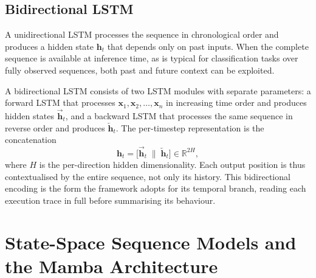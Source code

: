 \documentclass[%
    BCOR=10mm,
    DIV=13,
    toc=bibliography,
    toc=listof,
    oneside,
    12pt,
]{scrbook}
\begin{document}
\subsection{Bidirectional LSTM}
\label{subsec:bilstm}

A unidirectional LSTM processes the sequence in chronological order and
produces a hidden state $\mathbf{h}_t$ that depends only on past inputs. When
the complete sequence is available at inference time, as is typical for
classification tasks over fully observed sequences, both past and future
context can be exploited.

A bidirectional LSTM consists of two LSTM modules with separate parameters: a
forward LSTM that processes $\mathbf{x}_1, \mathbf{x}_2, \ldots, \mathbf{x}_n$
in increasing time order and produces hidden states
$\overrightarrow{\mathbf{h}}_t$, and a backward LSTM that processes the same
sequence in reverse order and produces $\overleftarrow{\mathbf{h}}_t$. The
per-timestep representation is the concatenation
\begin{equation}
  \mathbf{h}_t = \bigl[ \overrightarrow{\mathbf{h}}_t \;\|\; \overleftarrow{\mathbf{h}}_t \bigr]
  \in \mathbb{R}^{2H},
  \label{eq:bilstm}
\end{equation}
where $H$ is the per-direction hidden dimensionality. Each output position is
thus contextualised by the entire sequence, not only its history. This
bidirectional encoding is the form the framework adopts for its temporal branch,
reading each execution trace in full before summarising its behaviour.

\iffalse
\section{State-Space Sequence Models and the Mamba Architecture}
\label{sec:mamba}
\end{document}
